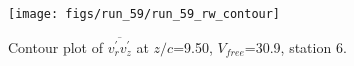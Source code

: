 \begin{figure}[H]
\centering
\texttt{[image: figs/run\_59/run\_59\_rw\_contour]}
\caption{Contour plot of $\overline{v_{r}^{\prime} v_{z}^{\prime}}$ at $z/c$=9.50, $V_{free}$=30.9, station 6.}
\label{fig:run_59_rw_contour}
\end{figure}


